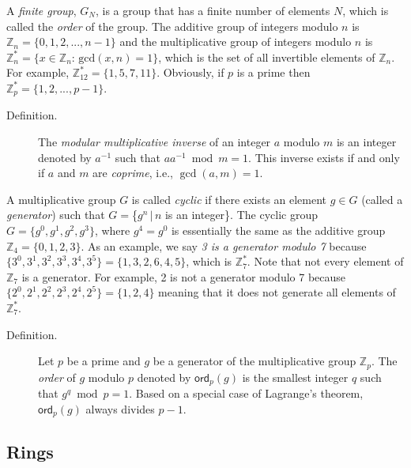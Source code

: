 \documentclass[10pt]{article}
\theoremstyle{plain}
\begin{document}
A \emph{finite group}, $G_{N}$, is a group that has a finite number
of elements $N$, which is called the \emph{order} of the group. The
additive group of integers modulo $n$ is $\mathbb{Z}_{n}=\{0,1,2,...,n-1\}$
and the multiplicative group of integers modulo $n$ is $\mathbb{Z}_{n}^{*}=\{x\in\mathbb{Z}_{n}:\,\text{gcd}(x,n)=1\}$,
which is the set of all invertible elements of $\mathbb{Z}_{n}$.
For example, $\mathbb{Z}_{12}^{*}=\{1,5,7,11\}$. Obviously, if $p$
is a prime then $\mathbb{Z}_{p}^{*}=\{1,2,...,p-1\}$.
\begin{description}
	\item [{Definition.}] \noindent The \emph{modular multiplicative inverse}
	of an integer $a$ modulo $m$ is an integer denoted by $a^{-1}$
	such that $aa^{-1}\bmod{m}=1$. This inverse exists if and only if
	$a$ and $m$ are \emph{coprime}, i.e., $\gcd(a,m)=1$.
\end{description}
A multiplicative group $G$ is called \emph{cyclic} if there exists
an element $g\in G$ (called a \emph{generator}) such that $G=$\{$g^{n}\,|\,n$
is an integer\}. The cyclic group $G=\{g^{0},g^{1},g^{2},g^{3}\}$,
where $g^{4}=g^{0}$ is essentially the same as the additive group
$\mathbb{Z}_{4}=\{0,1,2,3\}$. As an example, we say \emph{3 is a
	generator modulo 7} because $\{3^{0},3^{1},3^{2},3^{3},3^{4},3^{5}\}=\{1,3,2,6,4,5\}$,
which is $\mathbb{Z}_{7}^{*}$. Note that not every element of $\mathbb{Z}_{7}$
is a generator. For example, 2 is not a generator modulo 7 because
$\{2^{0},2^{1},2^{2},2^{3},2^{4},2^{5}\}=\{1,2,4\}$ meaning that
it does not generate all elements of $\mathbb{Z}_{7}^{*}$.
\begin{description}
	\item [{Definition.}] \noindent Let $p$ be a prime and $g$ be a generator
	of the multiplicative group $\mathbb{Z}_{p}$. The \emph{order} of
	$g$ modulo $p$ denoted by $\mathsf{ord}_{p}(g)$ is the smallest
	integer $q$ such that $g^{q}\bmod{p}=1$. Based on a special case
	of Lagrange's theorem, $\mathsf{ord}_{p}(g)$ always divides $p-1$.
\end{description}

\subsection{Rings}
\end{document}
